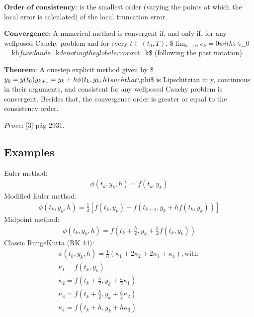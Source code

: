 \documentclass[letterpaper,10pt,english]{jupyterBook}
\begin{document}
\sphinxAtStartPar
\(\textbf{Order of consistency:}\) is the smallest order (varying the points at which the local error is calculated) of the local truncation error.

\sphinxAtStartPar
\(\textbf{Convergence:}\) A numerical method is convergent if, and only if, for any well\sphinxhyphen{}posed Cauchy problem and for every \(t \in (t_0, T)\),
\$\(\lim_{h \to 0} e_k = 0\)\(
with \)t \sphinxhyphen{} t\_0 = kh\( fixed and \)e\_k\( denoting the global error on \)t\_k\$ (following the past notation).

\sphinxAtStartPar
\(\textbf{Theorem:}\) A one\sphinxhyphen{}step explicit method given by
\$\(
y_0 = y(t_0) \\
y_{k+1} = y_{k} + h \phi (t_{k},y_{k},h)
\)\(
such that \)\textbackslash{}phi\$ is Lipschitzian in y, continuous in their arguments, and consistent for any well\sphinxhyphen{}posed Cauchy problem is convergent. Besides that, the convergence order is greater or equal to the consistency order.

\sphinxAtStartPar
\(\textit{Prove:}\) {[}3{]} pág 29\sphinxhyphen{}31.


\subsection{Examples}
\label{\detokenize{cap2:examples}}
\sphinxAtStartPar
Euler method:
\begin{equation*}
\begin{split}
    \phi (t_{k},y_{k},h) = f(t_{k},y_{k})
\end{split}
\end{equation*}
\sphinxAtStartPar
Modified Euler method:
\begin{equation*}
\begin{split}
    \phi (t_{k},y_{k},h) = \frac{1}{2} \left[ f(t_{k},y_{k}) + f(t_{k+1},y_{k} + h f(t_{k},y_{k})) \right]
\end{split}
\end{equation*}
\sphinxAtStartPar
Midpoint method:
\begin{equation*}
\begin{split}
    \phi (t_{k},y_{k},h) = f(t_{k} + \frac{h}{2},y_{k} + \frac{h}{2} f(t_{k},y_{k}))
\end{split}
\end{equation*}
\sphinxAtStartPar
Classic Runge\sphinxhyphen{}Kutta (RK 4\sphinxhyphen{}4):
\begin{equation*}
\begin{split}
    \phi (t_{k},y_{k},h) = \frac{1}{6} \left( \kappa_1 + 2 \kappa_2 + 2 \kappa_3 + \kappa_4 \right), \text{with }\\
    \kappa_1 = f(t_{k},y_{k})\\
    \kappa_2 = f(t_{k} + \frac{h}{2},y_{k} + \frac{h}{2} \kappa_1)\\
    \kappa_3 = f(t_{k} + \frac{h}{2},y_{k} + \frac{h}{2} \kappa_2)\\
    \kappa_4 = f(t_{k} + h, y_{k} + h \kappa_3)
\end{split}
\end{equation*}
\end{document}
